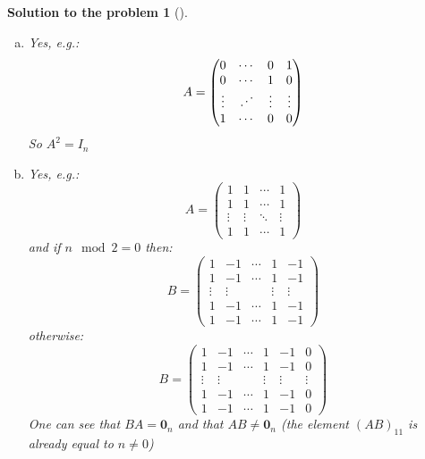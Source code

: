 \documentclass[12pt,a4]{article}
\newtheorem{solution}{Solution to the problem}
\begin{document}
\begin{solution}[]
\begin{enumerate}[(a)]
		\[
		B(B^\top B)^{-1}(B^\top B)(B^\top B)^{-1}B^\top =B(B^\top B)^{-1}B^\top 
		\]
		Since we can find such B (e.g. $B=\begin{pmatrix}
		1 &\cdots & 0 & 0\\ 
		\vdots & \ddots & \vdots & \vdots \\
		0 &\cdots & 1 & 0  \\
		0 &\cdots & 0 & 5
		\end{pmatrix}$) then $A=B(B^\top B)^{-1}B^\top \neq I_n$, $\neq \mathbf{0}_n$.
		\item Yes, e.g.:
		\[
		A = \begin{pmatrix}
		0 & \cdots & 0 & 1 \\ 
		0 & \cdots & 1 & 0  \\
		\vdots & \reflectbox{$\ddots$} & \vdots & \vdots \\
		1 & \cdots & 0 & 0
		\end{pmatrix}
		\]
		So $A^2 = I_n$
		\item Yes, e.g.:\\
		\[
		A = \begin{pmatrix}
		1 & 1 &\cdots & 1 \\ 
		1 & 1 &\cdots & 1  \\
		\vdots & \vdots & \ddots  & \vdots \\
		1 & 1 &\cdots & 1
		\end{pmatrix} 
		\]
		and if $n \mod 2 = 0$ then:
		\[
		B = \begin{pmatrix}
		1 & -1 &\cdots & 1 & -1 \\ 
		1 & -1 &\cdots & 1 & -1  \\
		\vdots & \vdots &  & \vdots & \vdots \\
		1 & -1 &\cdots & 1 & -1  \\
		1 & -1 &\cdots & 1 & -1
		\end{pmatrix}
		\]
		otherwise:
		\[
		B = \begin{pmatrix}
		1 & -1 &\cdots & 1 & -1 & 0\\ 
		1 & -1 &\cdots & 1 & -1  & 0\\
		\vdots & \vdots &  & \vdots & \vdots & \vdots \\
		1 & -1 &\cdots & 1 & -1 & 0 \\
		1 & -1 &\cdots & 1 & -1 & 0
		\end{pmatrix}
		\]
		One can see that $BA=\mathbf{0}_n$ and that $AB \neq \mathbf{0}_n$ (the element $(AB)_{11}$ is already equal to $ n \neq 0$)
	\end{enumerate}
\end{solution}
\end{document}
